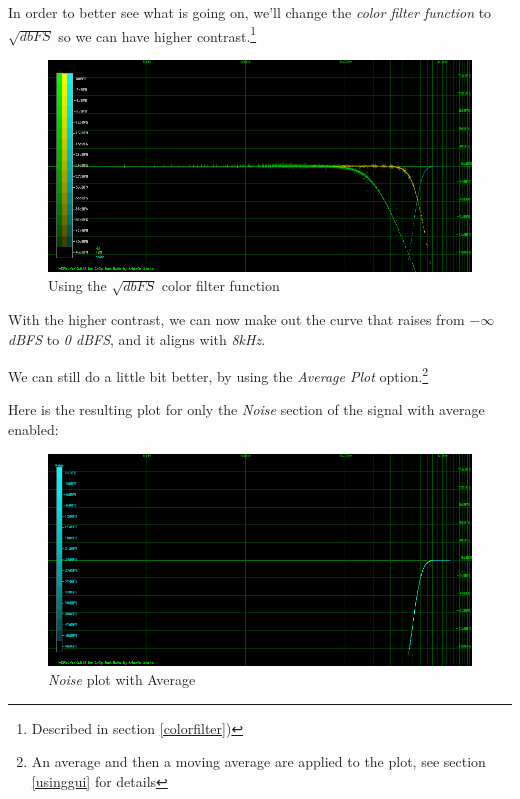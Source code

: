 \documentclass[10pt,a4paper]{report}
\begin{document}
In order to better see what is going on, we'll change the \textit{color filter function} to $\sqrt{dbFS}$ so we can have higher contrast.\footnote{Described in section \ref{colorfilter})}

\begin{figure}[H]
	\centering
	\includegraphics[width=1.0\linewidth]{plots/Plot4-2-All-sqrt.png}
	\caption[Using SQRT]{Using the $\sqrt{dbFS}$ color filter function}
	\label{fig:plot4-2-all-sqrt}
\end{figure}

With the higher contrast, we can now make out the curve that raises from \textit{$-\infty$ dBFS} to \textit{0 dBFS}, and it aligns with \textit{8kHz}.

We can still do a little bit better, by using the \textit{Average Plot} option.\footnote{An average and then a moving average are applied to the plot, see section \ref{usinggui} for details}

Here is the resulting plot for only the \textit{Noise} section of the signal with average enabled:

\begin{figure}[H]
	\centering
	\includegraphics[width=1.0\linewidth]{plots/Plot4-3-AVG-Noise.png}
	\caption[Noise Average]{\textit{Noise} plot with Average}
	\label{fig:plot4-3-avg-noise}
\end{figure}
\end{document}
